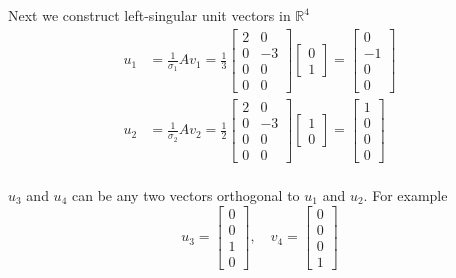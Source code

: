 \documentclass[12pt]{article} %
\newcommand{\R}{\mathbb{R}}
\begin{document}
{Next we construct left-singular unit vectors in $\R^4$
\begin{align*}
	u_1 &= \frac{1}{\sigma_1} A v_1 = \frac{1}{3} \begin{bmatrix}
		2 & 0\\
		0 & -3\\
		0 & 0\\
		0 & 0
	\end{bmatrix} \begin{bmatrix}
		0\\1
	\end{bmatrix} = \begin{bmatrix}
		0\\-1\\0\\0
	\end{bmatrix}\\
	u_2 &= \frac{1}{\sigma_2} A v_2 = \frac{1}{2} \begin{bmatrix}
		2 & 0\\
		0 & -3\\
		0 & 0\\
		0 & 0
	\end{bmatrix} \begin{bmatrix}
		1\\0
	\end{bmatrix} = \begin{bmatrix}
		1\\0\\0\\0
	\end{bmatrix}\\
\end{align*}

$u_3$ and $u_4$ can be any two vectors orthogonal to $u_1$ and $u_2$. For example
$$u_3 = \begin{bmatrix}
	0\\0\\1\\0
\end{bmatrix}, \quad v_4 = \begin{bmatrix}
	0\\0\\0\\1
\end{bmatrix}$$

}
\end{document}
